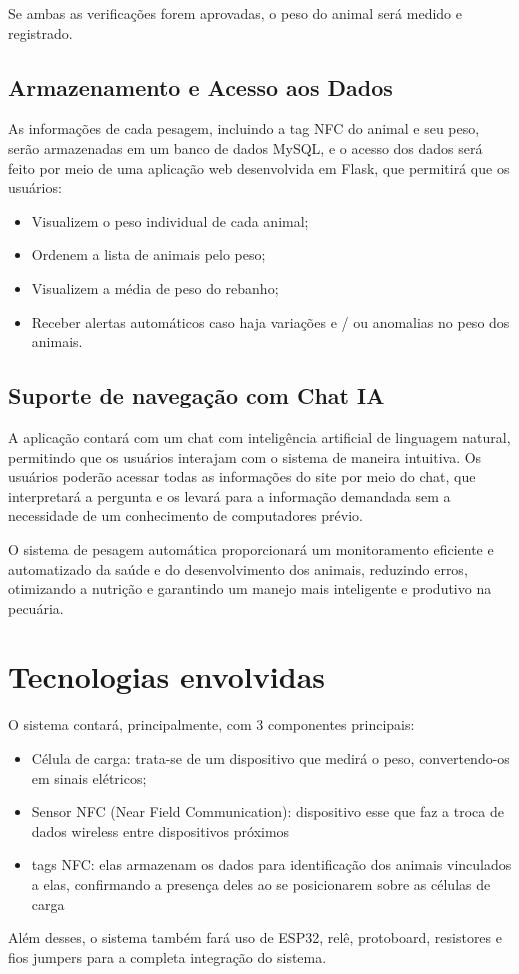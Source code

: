 \documentclass[11pt]{article}
\begin{document}
Se ambas as verificações forem aprovadas, o peso do animal será medido e registrado.

\subsection{Armazenamento e Acesso aos Dados}
As informações de cada pesagem, incluindo a tag NFC do animal e seu peso, serão armazenadas em um banco de dados MySQL, e o acesso dos dados será feito por meio de uma aplicação web desenvolvida em Flask, que permitirá que os usuários:

\begin{itemize}
    \item Visualizem o peso individual de cada animal;
    \item Ordenem a lista de animais pelo peso;
    \item Visualizem a média de peso do rebanho;
    \item Receber alertas automáticos caso haja variações e / ou anomalias no peso dos animais.
\end{itemize}

\subsection{Suporte de navegação com Chat IA}
A aplicação contará com um chat com inteligência artificial de linguagem natural, permitindo que os usuários interajam com o sistema de maneira intuitiva. Os usuários poderão acessar todas as informações do site por meio do chat, que interpretará a pergunta e os levará para a informação demandada sem a necessidade de um conhecimento de computadores prévio.

O sistema de pesagem automática proporcionará um monitoramento eficiente e automatizado da saúde e do desenvolvimento dos animais, reduzindo erros, otimizando a nutrição e garantindo um manejo mais inteligente e produtivo na pecuária.

\section{Tecnologias envolvidas}
O sistema contará, principalmente, com 3 componentes principais:
\begin{itemize}
    \item Célula de carga: trata-se de um dispositivo que medirá o peso, convertendo-os em sinais elétricos;
    \item Sensor NFC (Near Field Communication): dispositivo esse que faz a troca de dados wireless entre dispositivos próximos
    \item  tags NFC: elas armazenam os dados para identificação dos animais vinculados a elas, confirmando a presença deles ao se posicionarem sobre as células de carga
\end{itemize}
Além desses, o sistema também fará uso de ESP32, relê, protoboard, resistores e fios jumpers para a completa integração do sistema.
\end{document}
